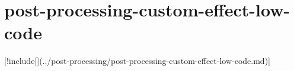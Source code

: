 \chapter{post-\/processing-\/custom-\/effect-\/low-\/code}
\hypertarget{md__hey_tea_9_2_library_2_package_cache_2com_8unity_8render-pipelines_8universal_0d14_80_88_2_do95d8b9aa44625c96e2a28af611032517}{}\label{md__hey_tea_9_2_library_2_package_cache_2com_8unity_8render-pipelines_8universal_0d14_80_88_2_do95d8b9aa44625c96e2a28af611032517}
\mbox{[}!include\mbox{[}\mbox{]}(../post-\/processing/post-\/processing-\/custom-\/effect-\/low-\/code.md)\mbox{]} 